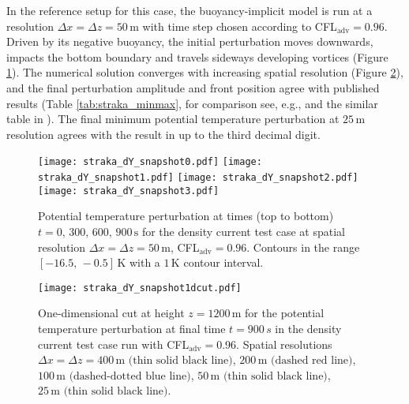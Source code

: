 \documentclass[12pt,a4paper]{article}
\theoremstyle{definition}
\begin{document}
In the reference setup for this case, the buoyancy-implicit model is run at a resolution $\Delta x=\Delta z=50\,\textrm{m}$ with time step chosen according to CFL$_\textrm{adv}=0.96$. Driven by its negative buoyancy, the initial perturbation moves downwards, impacts the bottom boundary and travels sideways developing vortices (Figure \ref{fig:straka}). The numerical solution converges with increasing spatial resolution (Figure \ref{fig:straka1dcut}), and the final perturbation amplitude and front position agree with published results (Table \ref{tab:straka_minmax}, for comparison see, e.g., \cite{GiraldoRestelli2008} and the similar table in \cite{MelvinEtAl2018}). The final minimum potential temperature perturbation at $25\,\textrm{m}$ resolution agrees with the result in \cite{MelvinEtAl2018} up to the third decimal digit.

\begin{figure}
\centering
 \texttt{[image: straka\_dY\_snapshot0.pdf]}
 \texttt{[image: straka\_dY\_snapshot1.pdf]}
 \texttt{[image: straka\_dY\_snapshot2.pdf]}
 \texttt{[image: straka\_dY\_snapshot3.pdf]}
 \caption{Potential temperature perturbation at times (top to bottom) $t=0,\,300,\,600,\,900\,\textrm{s}$ for the density current test case at spatial resolution $\Delta x=\Delta z=50\,\textrm{m}$, CFL$_\textrm{adv}=0.96$. Contours in the range $[-16.5,\,-0.5]\,\textrm{K}$ with a $1\,\textrm{K}$ contour interval.}
 \label{fig:straka}
\end{figure}

\begin{figure}
\centering
  \texttt{[image: straka\_dY\_snapshot1dcut.pdf]}
 \caption{One-dimensional cut at height $z=1200\,\textrm{m}$ for the potential temperature perturbation at final time $t=900\, s$ in the density current test case run with CFL$_\textrm{adv}=0.96$. Spatial resolutions $\Delta x=\Delta z=400\,\textrm{m (thin solid black line)}$, $200\,\textrm{m (dashed red line)}$, $100\,\textrm{m (dashed-dotted blue line)}$, $50\,\textrm{m (thin solid black line)}$, $25\,\textrm{m (thin solid black line)}$.}
 \label{fig:straka1dcut}
\end{figure}
\end{document}
